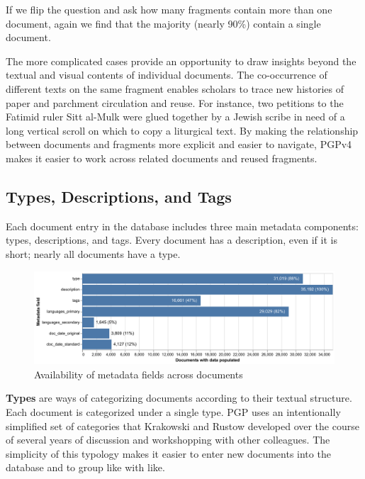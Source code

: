 \documentclass{article}
\begin{document}

If we flip the question and ask how many fragments contain more than one document, again we find that the majority (nearly 90\%) contain a single document.

The more complicated cases provide an opportunity to draw insights beyond the textual and visual contents of individual documents. The co-occurrence of different texts on the same fragment enables scholars to trace new histories of paper and parchment circulation and reuse. For instance, two petitions to the Fatimid ruler Sitt al-Mulk \autocite{noauthor_state_1024, noauthor_state_1021} were glued together by a Jewish scribe in need of a long vertical scroll on which to copy a liturgical text. By making the relationship between documents and fragments more explicit and easier to navigate, PGPv4 makes it easier to work across related documents and reused fragments.

\subsection{Types, Descriptions, and Tags}

Each document entry in the database includes three main metadata components: types, descriptions, and tags. Every document has a description, even if it is short; nearly all documents have a type.

\begin{figure}[!hbt]
    \centering
    \includegraphics[width=1.0\linewidth]{charts/metadata_available.pdf}
    \caption{Availability of metadata fields across documents}
    \label{fig:metadata-status}
\end{figure}

\textbf{Types} are ways of categorizing documents according to their textual structure. Each document is categorized under a single type. PGP uses an intentionally simplified set of categories that Krakowski and Rustow developed over the course of several years of discussion and workshopping with other colleagues. The simplicity of this typology makes it easier to enter new documents into the database and to group like with like. 
\end{document}

